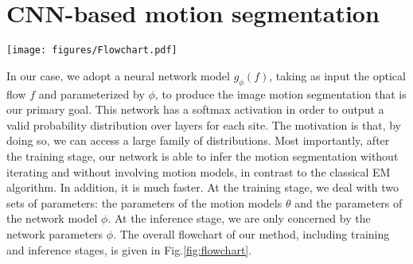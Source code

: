 \documentclass[10pt,twocolumn,letterpaper]{article}
\begin{document}
\section{CNN-based motion segmentation}
\label{CNN}

\begin{figure*}[tbh!]
\centering
\texttt{[image: figures/Flowchart.pdf]}
\caption{Flowchart of the proposed CNN method for the training (top) and inference (bottom) steps. \textit{Training step}: First, we segment the optical flow field $f$ with the neural network $g_\phi$. Then, we get the optimal parametric motion models $\{f_{\theta_k^*}\}_{k=1,\dots,K}$ within each probabilistic segmentation masks $\{g_\phi(f)^k\}_{k=1,\dots,K}$ using~\eqref{eq:theta_optimal}. Finally, we update the parameters $\phi$ of the neural network using~\eqref{eq:phi_optimal}, where the loss function is defined in~\eqref{eq:loss}. This training step is performed iteratively over each batch $\mathcal{B}$ (of size 1 in this illustration). \textit{Inference step}: We directly apply the trained network $g_{\phi^*}$ to any new unseen optical flow field $f$ to obtain the probabilistic segmentation masks $\{g_{\phi^*}(f)^k\}_{k=1,\dots,K}$. There is no estimation of the motion models $\{f_{\theta_k^*}\}_{k=1,\dots,K}$ in the inference step in contrast to the training step. For the sake of visualization, optical flows and polynomial motion models are represented with the HSV color code, but actually, the flow field $f$ used as input of the neural network is taken as a 2D vector field. We have a two-channel input. {\color{black} \textit{Optical flow coding:} correspondence between the arrow visualization of the optical flow field and the HSV color map.}}
\label{fig:flowchart}
 \vspace{-0.3cm}
\end{figure*}

In our case, we adopt a neural network model $g_\phi(f)$, taking as input the optical flow $f$ and parameterized by $\phi$, to produce the image motion segmentation that is our primary goal. {\color{black} This network has a softmax activation in order to output a valid probability distribution over layers for each site.}
The motivation is that, by doing so, we can access a large family of distributions. Most importantly, after the training stage, our network is able to infer the motion segmentation without iterating and without involving motion models,
in contrast to the classical EM algorithm. In addition, it is much faster. At the training stage, we deal with two sets of parameters: the parameters of the motion models $\theta$ and the parameters of the network model $\phi$. At the inference stage, we are only concerned by the network parameters $\phi$.
The overall flowchart of our method, including training and inference stages, is given in Fig.\ref{fig:flowchart}.
\end{document}
